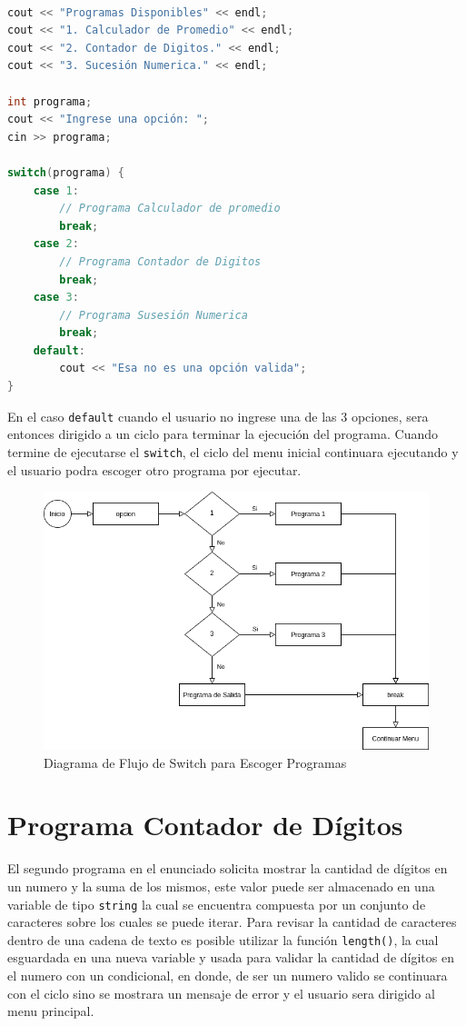 \documentclass[12pt]{article}
\begin{document}
\begin{lstlisting}[language=c++]

cout << "Programas Disponibles" << endl;
cout << "1. Calculador de Promedio" << endl;
cout << "2. Contador de Digitos." << endl;
cout << "3. Sucesión Numerica." << endl;

int programa;
cout << "Ingrese una opción: ";
cin >> programa;

switch(programa) {
    case 1:
        // Programa Calculador de promedio
        break;
    case 2:
        // Programa Contador de Digitos
        break;
    case 3:
        // Programa Susesión Numerica
        break;
    default:
        cout << "Esa no es una opción valida";
}
\end{lstlisting}

En el caso \verb+default+ cuando el usuario no ingrese una de las 3 opciones, sera entonces dirigido a un ciclo para terminar la ejecución del programa. Cuando termine de ejecutarse el \verb+switch+, el ciclo del menu inicial continuara ejecutando y el usuario podra escoger otro programa por ejecutar.

\begin{figure}[H]
    \caption{Diagrama de Flujo de Switch para Escoger Programas}
    \centering
    \includegraphics[scale=0.4]{switch_menu.png}
\end{figure}


\section{Programa Contador de Dígitos}

El segundo programa en el enunciado solicita mostrar la cantidad de dígitos en un numero y la suma de los mismos, este valor puede ser almacenado en una variable de tipo \verb+string+ la cual se encuentra compuesta por un conjunto de caracteres sobre los cuales se puede iterar. Para revisar la cantidad de caracteres dentro de una cadena de texto es posible utilizar la función \verb+length()+, la cual esguardada en una nueva variable y usada para validar la cantidad de dígitos en el numero con un condicional, en donde, de ser un numero valido se continuara con el ciclo sino se mostrara un mensaje de error y el usuario sera dirigido al menu principal.
\end{document}
